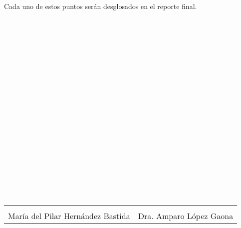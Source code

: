 \documentclass{article}
\begin{document}
Cada uno de estos puntos serán desglosados en el reporte final.
\\
\\
\\
\\
\\
\\
\\
\\
\\

\\
\\
\\
\\
\\
\\
\\
\\
\\
\\
\\


\noindent
\begin{tabular}{@{}p{3.0in}p{3.0in}@{}}
  \hrulefill & \hrulefill \\
  \centering María del Pilar Hernández Bastida & 
  \centering Dra. Amparo López Gaona \\
\end{tabular}
\end{document}
